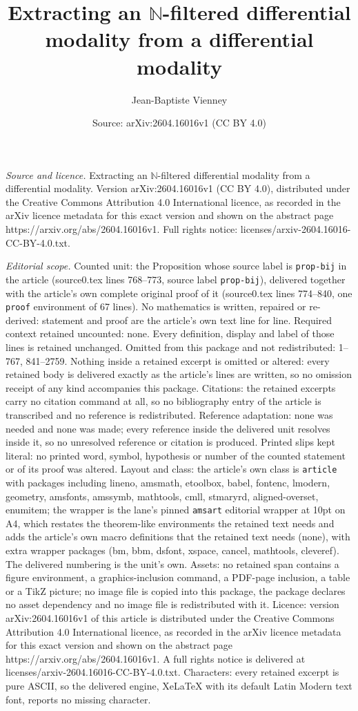 \documentclass[10pt,a4paper]{amsart}
\title[Extracting an $\mathbb{N}$-filtered differential modality fr]{Extracting an $\mathbb{N}$-filtered differential modality from a differential modality}
\author{Jean-Baptiste Vienney}
\date{Source: arXiv:2604.16016v1 (CC BY 4.0)}
\begin{document}
\maketitle

\noindent\emph{Source and licence.} Extracting an $\mathbb{N}$-filtered differential modality from a differential modality. Version arXiv:2604.16016v1 (CC BY 4.0), distributed under the Creative Commons Attribution 4.0 International licence, as recorded in the arXiv licence metadata for this exact version and shown on the abstract page https://arxiv.org/abs/2604.16016v1. Full rights notice: licenses/arxiv-2604.16016-CC-BY-4.0.txt.\par\smallskip

\noindent\textit{Editorial scope.} Counted unit: the Proposition whose source label is \texttt{prop-bij} in the article (source0.tex lines 768--773, source label \texttt{prop-bij}), delivered together with the article's own complete original proof of it (source0.tex lines 774--840, one \texttt{proof} environment of 67 lines). No mathematics is written, repaired or re-derived: statement and proof are the article's own text line for line. Required context retained uncounted: none. Every definition, display and label of those lines is retained unchanged. Omitted from this package and not redistributed: 1--767, 841--2759. Nothing inside a retained excerpt is omitted or altered: every retained body is delivered exactly as the article's lines are written, so no omission receipt of any kind accompanies this package. Citations: the retained excerpts carry no citation command at all, so no bibliography entry of the article is transcribed and no reference is redistributed. Reference adaptation: none was needed and none was made; every reference inside the delivered unit resolves inside it, so no unresolved reference or citation is produced. Printed slips kept literal: no printed word, symbol, hypothesis or number of the counted statement or of its proof was altered. Layout and class: the article's own class is \texttt{article} with packages including lineno, amsmath, etoolbox, babel, fontenc, lmodern, geometry, amsfonts, amssymb, mathtools, cmll, stmaryrd, aligned-overset, enumitem; the wrapper is the lane's pinned \texttt{amsart} editorial wrapper at 10pt on A4, which restates the theorem-like environments the retained text needs and adds the article's own macro definitions that the retained text needs (none), with extra wrapper packages (bm, bbm, dsfont, xspace, cancel, mathtools, cleveref). The delivered numbering is the unit's own. Assets: no retained span contains a figure environment, a graphics-inclusion command, a PDF-page inclusion, a table or a TikZ picture; no image file is copied into this package, the package declares no asset dependency and no image file is redistributed with it. Licence: version arXiv:2604.16016v1 of this article is distributed under the Creative Commons Attribution 4.0 International licence, as recorded in the arXiv licence metadata for this exact version and shown on the abstract page https://arxiv.org/abs/2604.16016v1. A full rights notice is delivered at licenses/arxiv-2604.16016-CC-BY-4.0.txt. Characters: every retained excerpt is pure ASCII, so the delivered engine, XeLaTeX with its default Latin Modern text font, reports no missing character.
\end{document}

